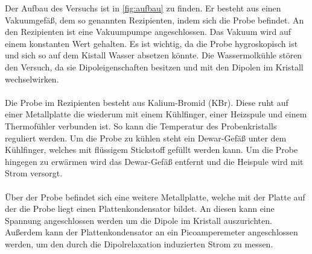 Der Aufbau des Versuchs ist in \autoref{fig:aufbau} zu finden.
Er besteht aus einen Vakuumgefäß, dem so genannten Rezipienten, indem sich die Probe befindet.
An den Rezipienten ist eine Vakuumpumpe angeschlossen.
Das Vakuum wird auf einem konstanten Wert gehalten.
Es ist wichtig, da die Probe hygroskopisch ist und sich so auf dem Kistall Wasser absetzen könnte.
Die Wassermolkühle stören den Versuch, da sie Dipoleigenschaften besitzen und mit den Dipolen im Kristall wechselwirken.
\\\\
Die Probe im Rezipienten besteht aus Kalium-Bromid (KBr).
Diese ruht auf einer Metallplatte die wiederum mit einem Kühlfinger, einer Heizspule und einem Thermofühler verbunden ist.
So kann die Temperatur des Probenkristalls reguliert werden.
Um die Probe zu kühlen steht ein Dewar-Gefäß unter dem Kühlfinger, welches mit flüssigem Stickstoff gefüllt werden kann.
Um die Probe hingegen zu erwärmen wird das Dewar-Gefäß entfernt und die Heispule wird mit Strom versorgt.
\\\\
Über der Probe befindet sich eine weitere Metallplatte, welche mit der Platte auf der die Probe liegt einen Plattenkondensator bildet.
An diesen kann eine Spannung angeschlossen werden um die Dipole im Kristall auszurichten.
Außerdem kann der Plattenkondensator an ein Picoamperemeter angeschlossen werden, um den durch die Dipolrelaxation induzierten Strom zu messen.

